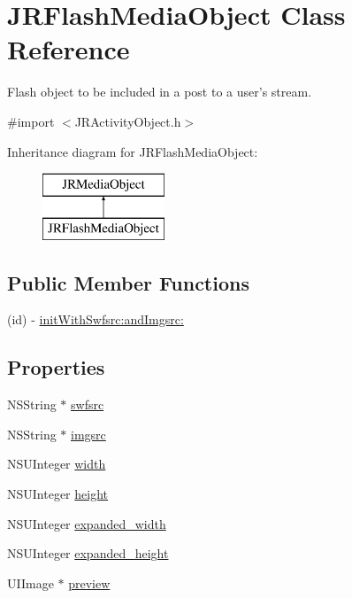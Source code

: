 \hypertarget{interface_j_r_flash_media_object}{
\section{JRFlashMediaObject Class Reference}
\label{interface_j_r_flash_media_object}
}


Flash object to be included in a post to a user's stream.  




{\ttfamily \#import $<$JRActivityObject.h$>$}

Inheritance diagram for JRFlashMediaObject:\begin{figure}[H]
\begin{center}
\leavevmode
\includegraphics[height=2.000000cm]{interface_j_r_flash_media_object}
\end{center}
\end{figure}
\subsection*{Public Member Functions}
\begin{DoxyCompactItemize}
\item 
(id) -\/ \hyperlink{interface_j_r_flash_media_object_aed4ac7b682373f36379eb81dea041513}{initWithSwfsrc:andImgsrc:}
\end{DoxyCompactItemize}
\subsection*{Properties}
\begin{DoxyCompactItemize}
\item 
NSString $\ast$ \hyperlink{interface_j_r_flash_media_object_a5a79b3d8071ac0286b3ee60e9e0138d0}{swfsrc}
\item 
NSString $\ast$ \hyperlink{interface_j_r_flash_media_object_a5a26cacd216012b37900445a8161ac56}{imgsrc}
\item 
NSUInteger \hyperlink{interface_j_r_flash_media_object_aaeb77e697438b7aa6e44f52bea0ed9c2}{width}
\item 
NSUInteger \hyperlink{interface_j_r_flash_media_object_a0689e19fdf6cb9d3911878a95d6ebcc9}{height}
\item 
NSUInteger \hyperlink{interface_j_r_flash_media_object_a9c380d0410afa60d99442f4ab84b517c}{expanded\_\-width}
\item 
NSUInteger \hyperlink{interface_j_r_flash_media_object_ae390a89405d768f2fcc63c24a8271503}{expanded\_\-height}
\item 
UIImage $\ast$ \hyperlink{interface_j_r_flash_media_object_ac2969bd0da7e91ffa99758dcccb26efb}{preview}
\end{DoxyCompactItemize}


